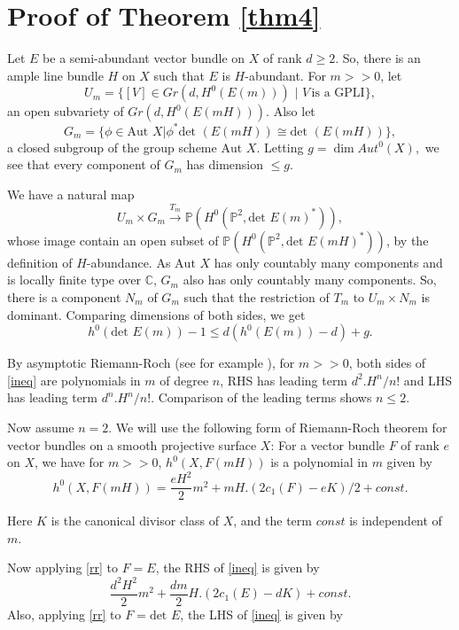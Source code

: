 \documentclass[11pt]{amsart}
\theoremstyle{definition}
\begin{document}
\section{Proof of Theorem \ref{thm4}}
Let $E$ be a semi-abundant vector bundle on $X$ of rank $d\geq 2$. So,
there is an 
ample line bundle $H$ on $X$ such that $E$ is $H$-abundant. 
For $m>>0$, let 
$$U_m = \{  [V] \in Gr(d, H^0(E(m))) \,\, | \,\, V  \, \text{is a GPLI} 
\},$$
an open subvariety of $Gr(d, H^0(E(mH))).$ Also let 
$$G_m=\{\phi\in \textrm{Aut }X| \phi^*\textrm{det }(E(mH))\cong 
\textrm{det }(E(mH))\},$$
a closed subgroup of the group scheme $\textrm{Aut }X.$ 
Letting $g=\dim Aut^0(X),$
we see that every component of $G_m$ has dimension $\leq g.$ 

We have a natural map
\[
  U_m\times G_m
  \xrightarrow{T_m} \mathbb{P}(H^0(\mathbb{P}^2, \textrm{det }E(m)^*)),  
 \] 
 whose image contain an open subset of $\mathbb{P}(H^0(\mathbb{P}^2, 
 \textrm{det }E(mH)^*))$, by the definition of $H$-abundance. As 
 $\textrm{Aut }X$ has only countably many components and is locally 
 finite type over $\mathbb{C}$, $G_m$ also has only countably many 
 components. So, there is a component $N_m$ of $G_m$ such that the 
 restriction of $T_m$ to $U_m\times N_m$ is dominant. Comparing 
 dimensions of both sides, we get 
 \begin{equation}\label{ineq}
     h^0(\textrm{det }E(m))-1\leq d(h^0(E(m))-d)+g.
 \end{equation}

 By asymptotic Riemann-Roch (see for example {\cite[Appendix]
 {kollar2013rational}}), for $m>>0$, both sides of \eqref{ineq} are 
 polynomials in $m$ of degree $n$, RHS has leading term $d^2.H^n/n!$
 and LHS has leading term $d^n.H^n/n!$. Comparison of the leading terms
 shows $n\leq 2.$

 Now assume $n=2.$ We will use the following form of Riemann-Roch 
 theorem for vector bundles on a smooth projective surface $X$: For a 
 vector bundle $F$ of rank $e$ on $X$, we have for $m>>0$,
 $h^0(X,F(mH))$ is a polynomial in $m$ given by
 \begin{equation}\label{rr}
     h^0(X,F(mH))=\frac{eH^2}{2}m^2+mH.(2c_1(F)-eK)/2+const.
 \end{equation}

 Here $K$ is the canonical divisor class of $X$, and the term $const$ 
 is independent of $m.$

 Now applying \eqref{rr} to $F=E$, the RHS of \eqref{ineq} is given by 
 $$ \frac{d^2H^2}{2}m^2+\frac{dm}{2}H.(2c_1(E)-dK)+const.$$ Also,
 applying \eqref{rr} to $F=\textrm{det }E$, the LHS of \eqref{ineq} is 
 given by 
\end{document}
